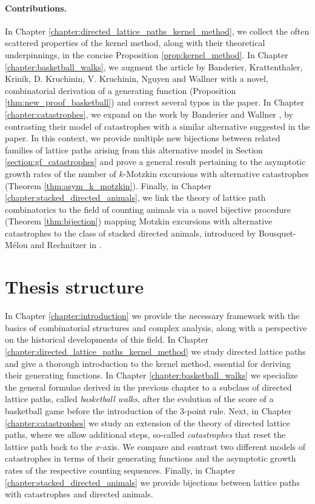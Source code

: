 \paragraph*{Contributions.}
In Chapter \ref{chapter:directed_lattice_paths_kernel_method}, we collect the often scattered properties of the kernel method, along with their theoretical underpinnings, in the concise Proposition \ref{prop:kernel_method}.
In Chapter \ref{chapter:basketball_walks}, we augment the article by Banderier, Krattenthaler, Krinik, D. Kruchinin, V. Kruchinin, Nguyen and Wallner \cite{Basketball} with a novel, combinatorial derivation of a generating function (Proposition \ref{thm:new_proof_basketball}) and correct several typos in the paper.
In Chapter \ref{chapter:catastrophes}, we expand on the work by Banderier and Wallner \cite{Catastrophes}, by contrasting their model of catastrophes with a similar alternative suggested in the paper. In this context, we provide multiple new bijections between related families of lattice paths arising from this alternative model in Section \ref{section:gf_catastrophes} and prove a general result pertaining to the asymptotic growth rates of the number of $k$-Motzkin excursions with alternative catastrophes (Theorem \ref{thm:asym_k_motzkin}).
Finally, in Chapter \ref{chapter:stacked_directed_animals}, we link the theory of lattice path combinatorics to the field of counting animals via a novel bijective procedure (Theorem \ref{thm:bijection}) mapping Motzkin excursions with alternative catastrophes to the class of stacked directed animals, introduced by Bousquet-Mélou and Rechnitzer in \cite{LatticeAnimals}.

\section*{Thesis structure}
\thispagestyle{empty}

In Chapter \ref{chapter:introduction} we provide the necessary framework with the basics of combinatorial structures and complex analysis, along with a perspective on the historical developments of this field. In Chapter \ref{chapter:directed_lattice_paths_kernel_method} we study directed lattice paths and give a thorough introduction to the kernel method, essential for deriving their generating functions. In Chapter \ref{chapter:basketball_walks} we specialize the general formulae derived in the previous chapter to a subclass of directed lattice paths, called \textit{basketball walks}, after the evolution of the score of a basketball game before the introduction of the 3-point rule. Next, in Chapter \ref{chapter:catastrophes} we study an extension of the theory of directed lattice paths, where we allow additional steps, so-called \textit{catastrophes} that reset the lattice path back to the $x$-axis. We compare and contrast two different models of catastrophes in terms of their generating functions and the asymptotic growth rates of the respective counting sequences. Finally, in Chapter \ref{chapter:stacked_directed_animals} we provide bijections between lattice paths with catastrophes and directed animals.

